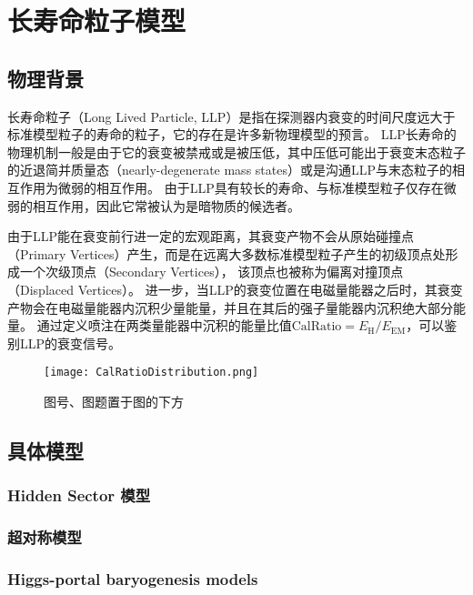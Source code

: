
\chapter{长寿命粒子模型}

\section{物理背景}
长寿命粒子（Long Lived Particle, LLP）是指在探测器内衰变的时间尺度远大于标准模型粒子的寿命的粒子，它的存在是许多新物理模型的预言。
LLP长寿命的物理机制一般是由于它的衰变被禁戒或是被压低，其中压低可能出于衰变末态粒子的近退简并质量态（nearly-degenerate mass states）或是沟通LLP与末态粒子的相互作用为微弱的相互作用。
由于LLP具有较长的寿命、与标准模型粒子仅存在微弱的相互作用，因此它常被认为是暗物质的候选者。

由于LLP能在衰变前行进一定的宏观距离，其衰变产物不会从原始碰撞点（Primary Vertices）产生，而是在远离大多数标准模型粒子产生的初级顶点处形成一个次级顶点（Secondary Vertices），
该顶点也被称为偏离对撞顶点（Displaced Vertices）。
进一步，当LLP的衰变位置在电磁量能器之后时，其衰变产物会在电磁量能器内沉积少量能量，并且在其后的强子量能器内沉积绝大部分能量。
通过定义喷注在两类量能器中沉积的能量比值$\text{CalRatio}=E_{\text{H}}/E_{\text{EM}}$，可以鉴别LLP的衰变信号。\cite{calratio}

\begin{figure}[ht]
    \centering
    \texttt{[image: CalRatioDistribution.png]}
    \caption{图号、图题置于图的下方}
    \label{fig:CalRatioDistribution}
\end{figure}


\section{具体模型}

\subsection{Hidden Sector 模型}

\subsection{超对称模型}

\subsection{Higgs-portal baryogenesis models}

